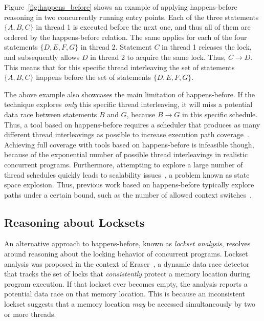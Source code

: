 Figure~\ref{fig:happens_before} shows an example of applying happens-before reasoning in two concurrently running entry points. Each of the three statements $\{A, B, C\}$ in thread 1 is executed before the next one, and thus all of them are ordered by the happens-before relation. The same applies for each of the four statements $\{D, E, F, G\}$ in thread 2. Statement $C$ in thread 1 releases the lock, and subsequently allows $D$ in thread 2 to acquire the same lock. Thus, $C \rightarrow D$. This means that for this specific thread interleaving the set of statements $\{A, B, C\}$ happens before the set of statements $\{D, E, F, G\}$.

The above example also showcases the main limitation of happens-before. If the technique explores \emph{only} this specific thread interleaving, it will miss a potential data race between statements $B$ and $G$, because $B \rightarrow G$ in this specific schedule. Thus, a tool based on happens-before requires a scheduler that produces as many different thread interleavings as possible to increase execution path coverage~\cite{savage1997eraser}. Achieving full coverage with tools based on happens-before is infeasible though, because of the exponential number of possible thread interleavings in realistic concurrent programs. Furthermore, attempting to explore a large number of thread schedules quickly leads to scalability issues~\cite{musuvathi2008finding}, a problem known as state space explosion. Thus, previous work based on happens-before typically explore paths under a certain bound, such as the number of allowed context switches~\cite{qadeer2004kiss}.

\subsection{Reasoning about Locksets}
\label{bg:lockset}

An alternative approach to happens-before, known as \emph{lockset analysis}, resolves around reasoning about the locking behavior of concurrent programs. Lockset analysis was proposed in the context of Eraser~\cite{savage1997eraser}, a dynamic data race detector that tracks the set of locks that \emph{consistently} protect a memory location during program execution. If that lockset ever becomes empty, the analysis reports a potential data race on that memory location.  This is because an inconsistent lockset suggests that a memory location \emph{may} be accessed simultaneously by two or more threads.

